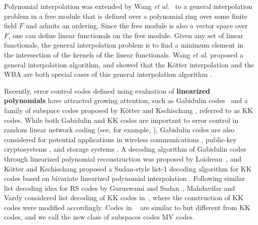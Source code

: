 \documentclass[11pt,onecolumn,draftcls]{IEEEtran}
\begin{document}
Polynomial interpolation was extended by Wang \emph{et al.}~\cite{WangMcEliece05} to a general interpolation problem in a free module that is defined over a polynomial ring over some finite field $F$ and admits an ordering. Since the free module is also a vector space over $F$, one can define linear functionals on the free module. Given any set of linear functionals, the general interpolation problem is to find a minimum element in the intersection of the kernels of the linear functionals. Wang \emph{et al.} proposed a general interpolation algorithm, and showed that the K\"{o}tter interpolation and the WBA are both special cases of this general interpolation algorithm \cite{WangMcEliece05}.

Recently, error control codes defined using evaluation of \textbf{linearized polynomials} have attracted growing attention, such as Gabidulin codes~\cite{gabidulin_pit0185} and a family of subspace codes proposed by K\"{o}tter and Kschischang \cite{kotter_it08}, referred to as KK codes. While both Gabidulin and KK codes are important to error control in random linear network coding (see, for example, \cite{kotter_it08,silva_it08,silva_it09}), Gabidulin codes are also considered for potential applications in wireless communications \cite{lusina_it03}, public-key cryptosystems \cite{gabidulin_lncs91}, and storage systems
\cite{gabidulin_pit0285, RothBookRS}. A decoding algorithm of Gabidulin codes through linearized polynomial reconstruction was proposed by Loidreau~\cite{loidreau_wcc05}, and K\"{o}tter and Kschischang proposed a Sudan-style list-1 decoding algorithm for KK codes based on bivariate linearized polynomial interpolation \cite{kotter_it08}. Following similar list decoding idea for RS codes by Guruswami and Sudan~\cite{GS99}, Mahdavifar and Vardy considered list decoding of KK codes in~\cite{mahdavifar_isit10}\cite{mahdavifar_it10}, where the construction of KK codes were modified accordingly. Codes in ~\cite{mahdavifar_isit10}\cite{mahdavifar_it10} are similar to but different from KK codes, and we call the new class of subspaces codes MV codes.
\end{document}
